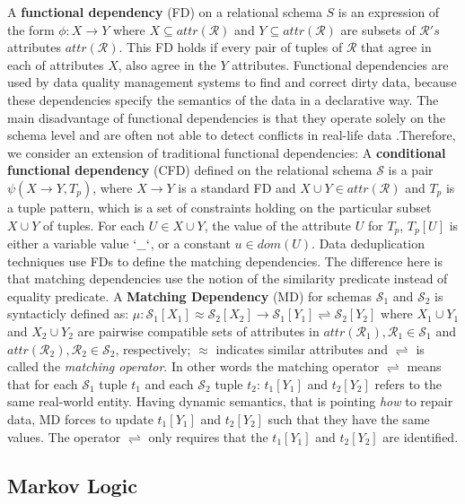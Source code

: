 A \textbf{functional dependency} (FD) on a relational schema $S$ is an expression of the form $\phi: X \rightarrow Y$ where $X \subseteq attr(\mathcal{R}) $ and $Y \subseteq attr(\mathcal{R}) $ are subsets of $\mathcal{R}'s$ attributes $attr(\mathcal{R})$. This FD holds if every pair of tuples of $\mathcal{R}$ that agree in each of attributes $X$, also agree in the $Y$ attributes. Functional dependencies are used by data quality management systems to find and correct dirty data, because these dependencies specify the semantics of the data in a declarative way. The main disadvantage of functional dependencies is that they operate solely on the schema level and are often not able to detect conflicts in real-life data .Therefore, we consider an  extension of traditional functional dependencies:  A \textbf{conditional functional dependency} (CFD) defined on the relational schema $\mathcal{S}$ is a pair $\psi(X \rightarrow Y , T_p)$,  where $X \rightarrow Y$ is a standard FD and $X \cup Y \in attr(\mathcal{R})$ and $T_p$ is a tuple pattern, which is a set of constraints holding on the particular subset $X \cup Y$ of tuples. For each $U \in X \cup Y$, the value of the attribute $U$ for $T_p$, $T_p[U]$ is either a variable value $`\_`$, or a constant $u \in dom(U)$. Data deduplication techniques use FDs to define the matching dependencies. The difference here is that matching dependencies use the notion of the similarity predicate instead of equality predicate. A \textbf{Matching Dependency} (MD) for schemas $\mathcal{S}_1$ and $\mathcal{S}_2$ is syntacticly defined as:
  $\mu: \mathcal{S}_1[X_1]\approx \mathcal{S}_2[X_2]\rightarrow \mathcal{S}_1[Y_1]\rightleftharpoons \mathcal{S}_2[Y_2]$ 
  where $X_1 \cup Y_1$ and $X_2 \cup Y_2$ are pairwise compatible sets of attributes in $attr(\mathcal{R}_1), \mathcal{R}_1\in \mathcal{S}_1$ and $attr(\mathcal{R}_2), \mathcal{R}_2\in \mathcal{S}_2$, respectively; $\approx$ indicates
  similar attributes and $\rightleftharpoons$ is called the \textit{matching operator}. In other words the matching operator $\rightleftharpoons$ means that for each $\mathcal{S}_1$ tuple $t_1$ and each $\mathcal{S}_2$ tuple $t_2$: $t_1[Y_1]$ and $t_2[Y_2]$ refers to the same real-world entity. Having dynamic semantics, that is pointing \textit{how} to repair data, MD forces to update $t_1[Y_1]$ and $t_2[Y_2]$ such that they have the same values. The operator $\rightleftharpoons$ only requires that the $t_1[Y_1]$ and $t_2[Y_2]$ are identified.

\subsection{Markov Logic}

